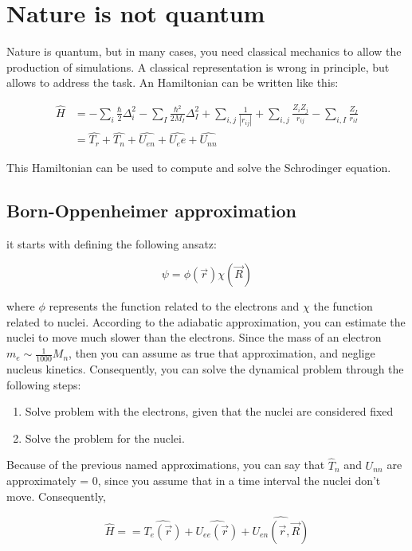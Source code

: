 \section{Nature is not quantum}
Nature is quantum, but in many cases, you need classical mechanics to allow the production of simulations.
A classical representation is wrong in principle, but allows to address the task.
An Hamiltonian can be written like this:

\begin{align*}
    \hat{H} &= - \sum_i{\frac{\hbar}{2} \Delta_i^2} - \sum_{I}{\frac{\hbar^2 }{2M_I} \Delta_I^2} + \sum_{i,j}\frac{1}{|r_{ij}|} + \sum_{i,j}\frac{Z_i Z_j}{r_{ij}} - \sum_{i, I}{\frac{Z_I}{r_{iI}}} \\
            &= \hat{T_r} + \hat{T_n} + \hat{U_{en}} + \hat{U_ee} + \hat{U_{nn}}
\end{align*}

This Hamiltonian can be used to compute and solve the Schrodinger equation.

\subsection{Born-Oppenheimer approximation}
it starts with defining the following ansatz:

$$
\psi = \phi(\vec{r}) \chi(\vec{R})
$$

where $\phi$ represents the function related to the electrons and $\chi$ the function related to nuclei. According to the adiabatic approximation, you can estimate the nuclei
to move much slower than the electrons. Since the mass of an electron $m_e \sim \frac{1}{1000} M_n$, then you can assume as true that approximation, and neglige nucleus kinetics.
Consequently, you can solve the dynamical problem through the following steps:

\begin{enumerate}
    \item Solve problem with the electrons, given that the nuclei are considered fixed
    \item Solve the problem for the nuclei.
\end{enumerate}

Because of the previous named approximations, you can say that $\hat{T}_n$ and $U_{nn}$ are approximately = 0, since you assume that in a time interval
the nuclei don't move. Consequently,

$$
    \hat{H} = = \hat{T_e(\vec{r})} + \hat{U_{ee}(\vec{r})} + \hat{U_{en}(\vec{r}, \vec{R})}
$$

